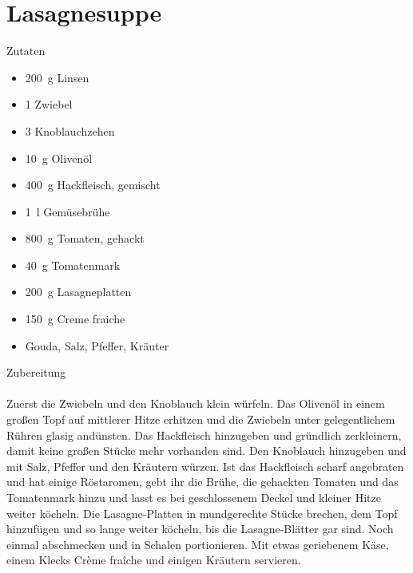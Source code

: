 \section*{Lasagnesuppe}
\ihead{}\ohead{}
\cfoot{}
{\Large Zutaten}
\begin{multicols}{2}
\begin{itemize}
    \item \SI{200}{g} Linsen
    \item \num{1} Zwiebel 
    \item \num{3} Knoblauchzehen
    \item \SI{10}{g} Olivenöl
    \item \SI{400}{g} Hackfleisch, gemischt
    \item \SI{1}{l} Gemüsebrühe
    \item \SI{800}{g} Tomaten, gehackt
    \item \SI{40}{g} Tomatenmark
    \item \SI{200}{g} Lasagneplatten
    \item \SI{150}{g} Creme fraiche
    \item Gouda, Salz, Pfeffer, Kräuter
\end{itemize}
\end{multicols}
\noindent
{\Large Zubereitung}\\
\\
Zuerst die Zwiebeln und den Knoblauch klein würfeln.
Das Olivenöl in einem großen Topf auf mittlerer Hitze erhitzen und die Zwiebeln unter gelegentlichem Rühren glasig andünsten.
Das Hackfleisch hinzugeben und gründlich zerkleinern, damit keine großen Stücke mehr vorhanden sind.
Den Knoblauch hinzugeben und mit Salz, Pfeffer und den Kräutern würzen.
Ist das Hackfleisch scharf angebraten und hat einige Röstaromen, gebt ihr die Brühe, die gehackten Tomaten und das Tomatenmark hinzu und lasst es bei geschlossenem Deckel und kleiner Hitze weiter köcheln.
Die Lasagne-Platten in mundgerechte Stücke brechen, dem Topf hinzufügen und so lange weiter köcheln, bis die Lasagne-Blätter gar sind.
Noch einmal abschmecken und in Schalen portionieren.
Mit etwas geriebenem Käse, einem Klecks Crème fraîche und einigen Kräutern servieren.
